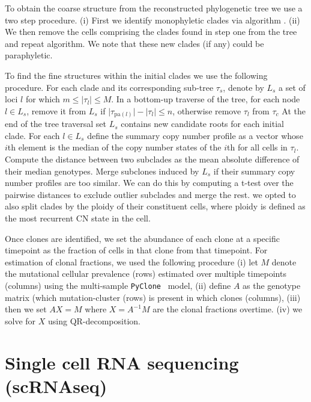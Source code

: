 To obtain the coarse structure from the reconstructed phylogenetic tree we use a two step procedure. (i) First we identify monophyletic clades via algorithm \cite{salehi2020single}. 
(ii) We then remove the cells comprising the clades found in step one from the tree and repeat algorithm. 
We note that these new clades (if any) could be paraphyletic.

To find the fine structures within the initial clades we use the following procedure.
For each clade and its corresponding sub-tree $\tau_s$, denote by $L_s$ a set of loci $l$ for which $m \le \lvert \tau_l \rvert \le M$. 
In a bottom-up traverse of the tree, for each node $l \in L_s$, remove it from $L_s$ if $\lvert \tau_{\text{pa}(l)} \rvert - \lvert \tau_{l} \rvert \le n$, otherwise remove $\tau_{l}$ from $\tau_c$
At the end of the tree traversal set $L_s$ contains new candidate roots for each initial clade.
For each $l \in L_s$ define the summary copy number profile as a vector whose $i$th element is the median of the copy number states of the $i$th for all cells in $\tau_{l}$.
Compute the distance between two subclades as the mean absolute difference of their median genotypes.
Merge subclones induced by $L_s$ if their summary copy number profiles are too similar.
We can do this by computing a t-test over the pairwise distances to exclude outlier subclades and merge the rest. we opted to also split clades by the ploidy of their constituent cells, where ploidy is defined as the most recurrent CN state in the cell.  

Once clones are identified, we set the abundance of each clone at a specific timepoint as the fraction of cells in that clone from that timepoint.
For estimation of clonal fractions, we used the following procedure (i) let $M$ denote the mutational cellular prevalence (rows) estimated over multiple timepoints (columns) using the multi-sample \texttt{PyClone}~\cite{roth2014pyclone} model, (ii) define $A$ as the genotype matrix (which mutation-cluster (rows) is present in which clones (columns), (iii) then we set $A X = M$ where $ X = A^{-1}M$ are the clonal fractions overtime. (iv) we solve for $X$ using QR-decomposition.


\section{Single cell RNA sequencing (scRNAseq)}

